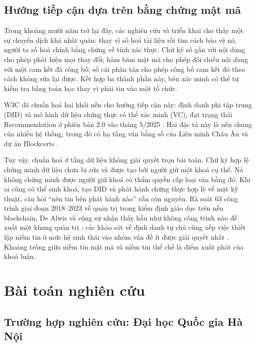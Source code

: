 \subsection{Hướng tiếp cận dựa trên bằng chứng mật mã}

Trong khoảng mười năm trở lại đây, các nghiên cứu và triển khai cho thấy một sự chuyển dịch khá nhất quán: thay vì số hoá tài liệu rồi tìm cách bảo vệ nó, người ta số hoá chính bằng chứng về tính xác thực. Chữ ký số gắn với nội dung cho phép phát hiện mọi thay đổi; hàm băm mật mã cho phép đối chiếu nội dung với một cam kết đã công bố; sổ cái phân tán cho phép công bố cam kết đó theo cách không sửa lại được. Kết hợp ba thành phần này, bên xác minh có thể tự kiểm tra bằng toán học thay vì phải tin vào một tổ chức.

W3C đã chuẩn hoá hai khối nền cho hướng tiếp cận này: định danh phi tập trung (DID) \cite{W3C_DIDCore2022} và mô hình dữ liệu chứng thực có thể xác minh (VC), đạt trạng thái Recommendation ở phiên bản 2.0 vào tháng 5/2025 \cite{W3C_VCDM2025}. Hai đặc tả này là nền chung của nhiều hệ thống, trong đó có hạ tầng văn bằng số của Liên minh Châu Âu \cite{EDC_ELM} và dự án Blockcerts \cite{Blockcerts2016}.

Tuy vậy, chuẩn hoá ở tầng dữ liệu không giải quyết trọn bài toán. Chữ ký hợp lệ chứng minh dữ liệu chưa bị sửa và được tạo bởi người giữ một khoá cụ thể. Nó không chứng minh được người giữ khoá có thẩm quyền cấp loại văn bằng đó. Khi ai cũng có thể sinh khoá, tạo DID và phát hành chứng thực hợp lệ về mặt kỹ thuật, câu hỏi ``nên tin bên phát hành nào'' vẫn còn nguyên. Rà soát 63 công trình giai đoạn 2018--2023 về quản trị trong kiểm định giáo dục trên nền blockchain, De Alwis và cộng sự nhận thấy hầu như không công trình nào đề xuất một khung quản trị \cite{DeAlwis2025}; các khảo sát về định danh tự chủ cũng xếp việc thiết lập niềm tin ở mức hệ sinh thái vào nhóm vấn đề ít được giải quyết nhất \cite{Schardong2022, Sedlmeir2021}. Khoảng trống giữa niềm tin mật mã và niềm tin thể chế là điểm xuất phát của khoá luận.

\section{Bài toán nghiên cứu}
\label{sec:bai-toan}

\subsection{Trường hợp nghiên cứu: Đại học Quốc gia Hà Nội}

